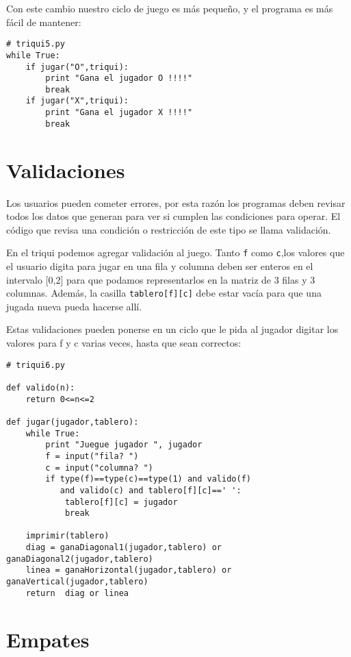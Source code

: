 Con este cambio nuestro ciclo de juego es más pequeño, y el programa es más
fácil de mantener:

\beforeverb
\begin{verbatim}
# triqui5.py
while True:
    if jugar("O",triqui):
        print "Gana el jugador O !!!!"
        break
    if jugar("X",triqui):
        print "Gana el jugador X !!!!"
        break
\end{verbatim}
\afterverb

\section{Validaciones}

Los usuarios pueden cometer errores, por esta razón los programas deben revisar
todos los datos que generan para ver si cumplen las condiciones
para operar. El código que revisa una condición 
o restricción de este tipo se llama validación.

En el triqui podemos agregar validación al juego. Tanto \texttt{f} como 
\texttt{c},los valores que el usuario digita para jugar en una fila y columna 
deben ser enteros en el intervalo [0,2] para 
que podamos representarlos en la matriz de 3 filas y 3 columnas. Además,
la casilla \texttt{tablero[f][c]} debe estar vacía para que
una jugada nueva pueda hacerse allí.  

Estas validaciones pueden ponerse en un ciclo que le pida al jugador
digitar los valores para f y c varias veces, hasta que sean correctos:

\beforeverb
\begin{verbatim}
# triqui6.py

def valido(n):
    return 0<=n<=2
    
def jugar(jugador,tablero):
    while True:     
        print "Juegue jugador ", jugador
        f = input("fila? ")
        c = input("columna? ")
        if type(f)==type(c)==type(1) and valido(f) 
           and valido(c) and tablero[f][c]==' ':
            tablero[f][c] = jugador
            break      

    imprimir(tablero)
    diag = ganaDiagonal1(jugador,tablero) or ganaDiagonal2(jugador,tablero)
    linea = ganaHorizontal(jugador,tablero) or ganaVertical(jugador,tablero)
    return  diag or linea

\end{verbatim}
\afterverb

\section{Empates}

